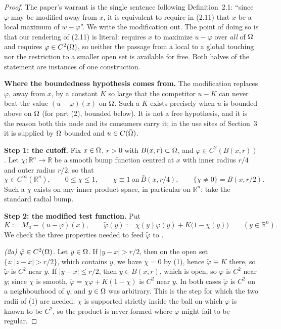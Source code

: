 \begin{proof}
The paper's warrant is the single sentence following Definition~2.1: ``since $\varphi$ may be
modified away from $x$, it is equivalent to require in (2.11) that $x$ be a local maximum
of $w-\varphi$''. We write the modification out. The point of doing so is that our
rendering of (2.11) is literal:  requires $x$ to maximize
$u-\varphi$ over \emph{all} of $\Omega$ and requires $\varphi\in C^{2}(\Omega)$, so neither the
passage from a local to a global touching nor the restriction to a smaller open set is
available for free. Both halves of the statement are instances of one construction.

\medskip\noindent\textbf{Where the boundedness hypothesis comes from.} The modification
replaces $\varphi$, away from $x$, by a constant $K$ so large that the competitor
$u-K$ can never beat the value $(u-\varphi)(x)$ on $\Omega$. Such a $K$ exists precisely when
$u$ is bounded above on $\Omega$ (for part (2), bounded below). It is not a free hypothesis,
and it is the reason both this node and its consumers carry it; in the use sites of
Section~3 it is supplied by $\Omega$ bounded and $u\in C(\bar{\Omega})$.

\medskip\noindent\textbf{Step 1: the cutoff.} Fix $x\in\Omega$, $r>0$ with
$B(x,r)\subset\Omega$, and $\varphi\in C^{2}(B(x,r))$. Let $\chi:\mathbb R^{n}\to\mathbb R$ be
a smooth bump function centred at $x$ with inner radius $r/4$ and outer radius $r/2$, so
that
\[
 \chi\in C^{\infty}(\mathbb R^{n}),\qquad 0\le\chi\le1,\qquad
 \chi\equiv1\ \text{on}\ \bar B(x,r/4),\qquad
 \{\chi\ne0\}=B(x,r/2). \tag{1}
\]
Such a $\chi$ exists on any inner product space, in particular on $\mathbb R^{n}$: take
the standard radial bump.

\medskip\noindent\textbf{Step 2: the modified test function.} Put
\[
 K:=M_u-(u-\varphi)(x),\qquad
 \tilde\varphi(y):=\chi(y)\varphi(y)+K\big(1-\chi(y)\big)\qquad (y\in\mathbb R^{n}). \tag{2}
\]
We check the three properties needed to feed $\tilde\varphi$ to .

\emph{(2a) $\tilde\varphi\in C^{2}(\Omega)$.} Let $y\in\Omega$. If $|y-x|>r/2$, then on the open
set $\{z:|z-x|>r/2\}$, which contains $y$, we have $\chi=0$ by (1), hence
$\tilde\varphi\equiv K$ there, so $\tilde\varphi$ is $C^{2}$ near $y$. If $|y-x|\le r/2$,
then $y\in B(x,r)$, which is open, so $\varphi$ is $C^{2}$ near $y$; since $\chi$ is
smooth, $\tilde\varphi=\chi\varphi+K(1-\chi)$ is $C^{2}$ near $y$. In both cases
$\tilde\varphi$ is $C^{2}$ on a neighbourhood of $y$, and $y\in\Omega$ was arbitrary. This is
the step for which the two radii of (1) are needed: $\chi$ is supported strictly inside
the ball on which $\varphi$ is known to be $C^{2}$, so the product is never formed where
$\varphi$ might fail to be regular.


\end{proof}
